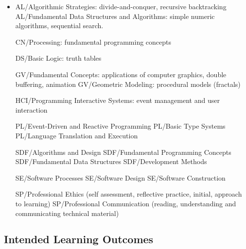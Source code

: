 \begin{itemize}
	\item 

AL/Algorithmic Strategies: divide-and-conquer, recursive backtracking
AL/Fundamental Data Structures and Algorithms: simple numeric algorithms, sequential search.

CN/Processing: fundamental programming concepts

DS/Basic Logic: truth tables

GV/Fundamental Concepts: applications of computer graphics, double buffering, animation
GV/Geometric Modeling: procedural models (fractals)

HCI/Programming Interactive Systems: event management and user interaction

PL/Event-Driven and Reactive Programming
PL/Basic Type Systems
PL/Language Translation and Execution

SDF/Algorithms and Design
SDF/Fundamental Programming Concepts
SDF/Fundamental Data Structures
SDF/Development Methods

SE/Software Processes
SE/Software Design
SE/Software Construction

SP/Professional Ethics (self assessment, reflective practice, initial, approach to learning)
SP/Professional Communication (reading, understanding and communicating technical material)
\end{itemize}



\cite{Gregor:2008}


\subsection{Intended Learning Outcomes} %
\label{sec:intro:intended_learning_outcomes}



